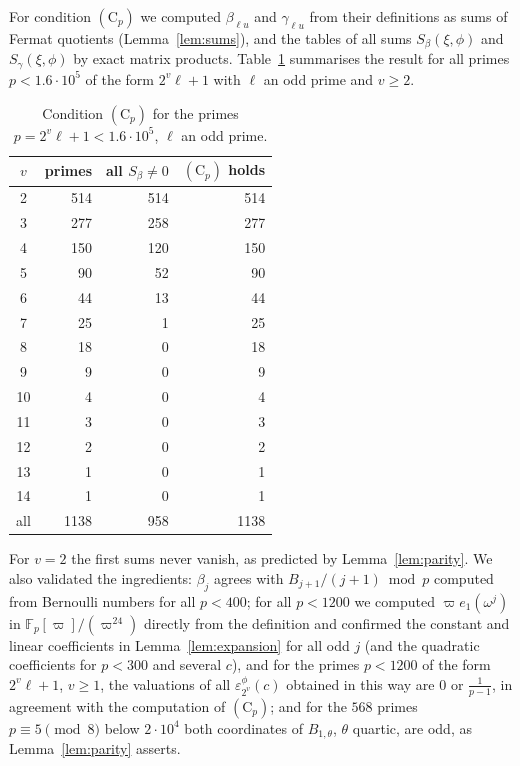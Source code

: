 \documentclass[11pt]{amsart}
\theoremstyle{definition}
\theoremstyle{remark}
\providecommand{\F}{\mathbb F}
\numberwithin{equation}{section}
\begin{document}
For condition $(\mathrm C_p)$ we computed $\beta_{\ell u}$ and $\gamma_{\ell u}$ from their definitions as sums of Fermat quotients (Lemma~\ref{lem:sums}), and the tables of all sums $S_\beta(\xi,\phi)$ and $S_\gamma(\xi,\phi)$ by exact matrix products.
Table~\ref{tab:Cp} summarises the result for all primes $p<1.6\cdot10^5$ of the form $2^v\ell+1$ with $\ell$ an odd prime and $v\ge2$.

\begin{table}[ht]
\centering
\begin{tabular}{crrr}
\toprule
$v$ & primes & all $S_\beta\ne0$ & $(\mathrm C_p)$ holds\\
\midrule
2 & 514 & 514 & 514\\
3 & 277 & 258 & 277\\
4 & 150 & 120 & 150\\
5 & 90 & 52 & 90\\
6 & 44 & 13 & 44\\
7 & 25 & 1 & 25\\
8 & 18 & 0 & 18\\
9 & 9 & 0 & 9\\
10 & 4 & 0 & 4\\
11 & 3 & 0 & 3\\
12 & 2 & 0 & 2\\
13 & 1 & 0 & 1\\
14 & 1 & 0 & 1\\
\midrule
all & 1138 & 958 & 1138\\
\bottomrule
\end{tabular}
\caption{Condition $(\mathrm C_p)$ for the primes $p=2^v\ell+1<1.6\cdot10^5$, $\ell$ an odd prime.}\label{tab:Cp}
\end{table}

For $v=2$ the first sums never vanish, as predicted by Lemma~\ref{lem:parity}.
We also validated the ingredients: $\beta_j$ agrees with $B_{j+1}/(j+1)\bmod p$ computed from Bernoulli numbers for all $p<400$; for all $p<1200$ we computed $\varpi e_1(\omega^j)$ in $\F_p[\varpi]/(\varpi^{24})$ directly from the definition and confirmed the constant and linear coefficients in Lemma~\ref{lem:expansion} for all odd $j$ (and the quadratic coefficients for $p<300$ and several $c$), and for the primes $p<1200$ of the form $2^v\ell+1$, $v\ge1$, the valuations of all $\varepsilon^\phi_{2^v}(c)$ obtained in this way are $0$ or $\frac1{p-1}$, in agreement with the computation of $(\mathrm C_p)$; and for the $568$ primes $p\equiv5\pmod 8$ below $2\cdot10^4$ both coordinates of $B_{1,\theta}$, $\theta$ quartic, are odd, as Lemma~\ref{lem:parity} asserts.
\end{document}
